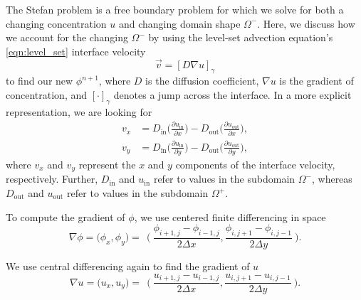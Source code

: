 \documentclass[oneside,12pt,final]{/Applications/TeX/packages/ucthesis-CA2012}
\begin{document}
\begin{mainmatter}
The Stefan problem is a free boundary problem for which we solve for both a changing concentration $u$ and changing domain shape $\Omega^-$. Here, we discuss how we account for the changing $\Omega^-$ by using the level-set advection equation's  \eqref{eqn:level_set}  interface velocity
\begin{equation}\label{eqn:int_velocity}
\vec{v} = [D \nabla u]_{\gamma}
\end{equation}
to find our new $\phi^{n+1}$, where $D$ is the diffusion coefficient, $\nabla u$ is the gradient of concentration, and $[\cdot]_\gamma$ denotes a jump across the interface. In a more explicit representation, we are looking for
\begin{equation}
\begin{aligned}
v_x &= D_\text{in} \bigg(\frac{\partial u_\text{in}}{\partial x}\bigg) - D_\text{out} \bigg(\frac{\partial u_\text{out}}{\partial x}\bigg),\\
v_y &= D_\text{in} \bigg(\frac{\partial u_\text{in}}{\partial y}\bigg) - D_\text{out} \bigg(\frac{\partial u_\text{out}}{\partial y}\bigg),
\end{aligned}
\end{equation}
where $v_{x}$ and $v_{y}$ represent the $x$ and $y$ components of the interface velocity, respectively. Further, $D_\text{in}$ and $u_\text{in}$ refer to values in the subdomain $\Omega^-$, whereas $D_\text{out}$ and $u_\text{out}$ refer to values in the subdomain $\Omega^+$.

To compute the gradient of $\phi$, we use centered finite differencing in space
\begin{equation} \label{eqn:central_diff}
\nabla \phi  = \bigg( \phi_x, \phi_y \bigg) =\>\>  \bigg( \> \frac{\phi_{i+1,j} - \phi_{i-1,j}}{2\Delta x}, \frac{\phi_{i,j+1} - \phi_{i,j-1}}{2\Delta y} \> \bigg).
\end{equation}

We use central differencing again to find the gradient of $u$
\begin{equation} \label{eqn:nablau}
\nabla u  = \bigg( u_x, u_y \bigg) =\>\>  \bigg( \> \frac{u_{i+1,j} - u_{i-1,j}}{2\Delta x}, \frac{u_{i,j+1} - u_{i,j-1}}{2\Delta y} \> \bigg).
\end{equation} 


\end{mainmatter}
\end{document}

